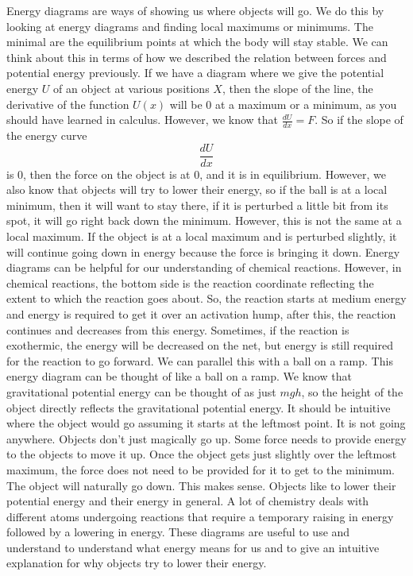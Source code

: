 \documentclass{article}[gray]
\numberwithin{equation}{subsection}
\begin{document}
Energy diagrams are ways of showing us where objects will go. We do this by looking at energy diagrams and finding local maximums or minimums. The minimal are the equilibrium points at which the body will stay stable. We can think about this in terms of how we described the relation between forces and potential energy previously. If we have a diagram where we give the potential energy $U$ of an object at various positions $X$, then the slope of the line, the derivative of the function $U\left(x\right)$ will be 0 at a maximum or a minimum, as you should have learned in calculus. However, we know that $\frac{dU}{dx}=F$. So if the slope of the energy curve $$\frac{dU}{dx}$$ is 0, then the force on the object is at 0, and it is in equilibrium. However, we also know that objects will try to lower their energy, so if the ball is at a local minimum, then it will want to stay there, if it is perturbed a little bit from its spot, it will go right back down the minimum. However, this is not the same at a local maximum. If the object is at a local maximum and is perturbed slightly, it will continue going down in energy because the force is bringing it down. Energy diagrams can be helpful for our understanding of chemical reactions. However, in chemical reactions, the bottom side is the reaction coordinate reflecting the extent to which the reaction goes about. So, the reaction starts at medium energy and energy is required to get it over an activation hump, after this, the reaction continues and decreases from this energy. Sometimes, if the reaction is exothermic, the energy will be decreased on the net, but energy is still required for the reaction to go forward. We can parallel this with a ball on a ramp. This energy diagram can be thought of like a ball on a ramp. We know that gravitational potential energy can be thought of as just $mgh$, so the height of the object directly reflects the gravitational potential energy. It should be intuitive where the object would go assuming it starts at the leftmost point. It is not going anywhere. Objects don't just magically go up. Some force needs to provide energy to the objects to move it up. Once the object gets just slightly over the leftmost maximum, the force does not need to be provided for it to get to the minimum. The object will naturally go down. This makes sense. Objects like to lower their potential energy and their energy in general. A lot of chemistry deals with different atoms undergoing reactions that require a temporary raising in energy followed by a lowering in energy. These diagrams are useful to use and understand to understand what energy means for us and to give an intuitive explanation for why objects try to lower their energy. 
\end{document}
